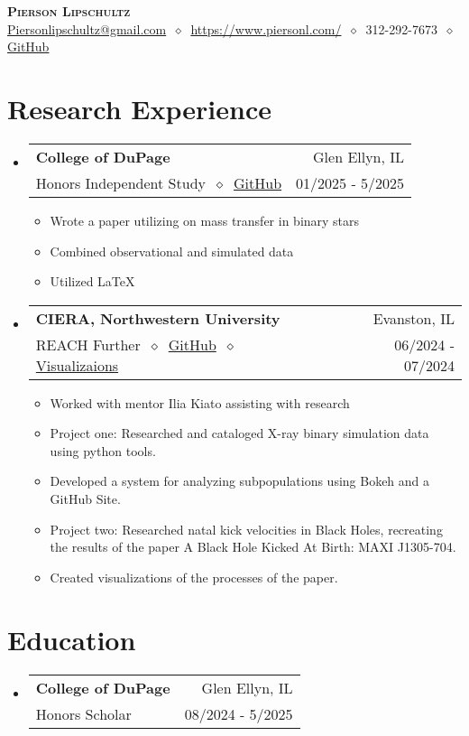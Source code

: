 \documentclass[letterpaper,11pt]{article}
\makeatletter
\newcommand{\cvitem}[1]{
  \item\small{
    {#1\vspace{-2pt}}
  }
}
\newcommand{\cvheading}[4]{
  \vspace{-2pt}\item
    \begin{tabular*}{\textwidth}[t]{l@{\extracolsep{\fill}}r}
      \textbf{#1} & #2 \\
      \small#3 & \small #4 \\
    \end{tabular*}\vspace{-7pt}
}
\newcommand{\cvheadingstart}{\begin{itemize}[leftmargin=0in, label={}]}
\newcommand{\cvheadingend}{\end{itemize}}
\newcommand{\cvitemstart}{\begin{itemize}[label=\textopenbullet]\justifying}
\newcommand{\cvitemend}{\end{itemize}\vspace{-5pt}}
\makeatother
\begin{document}
\begin{center}
  \textbf{\LARGE\scshape Pierson Lipschultz} \\
  \vspace{1pt}\small
  \href{mailto:}{Piersonlipschultz@gmail.com}
  $\ \diamond\ $
  \href{https://www.piersonl.com/}{https://www.piersonl.com/}
  $\ \diamond\ $ 
  312-292-7673
  $\ \diamond\ $
  \href{https://github.com/PiersonLip}{GitHub}
\end{center}

\section{Research Experience}
\cvheadingstart
  \cvheading
    {College of DuPage}{Glen Ellyn, IL}
    {Honors Independent Study $\ \diamond\ $ \href{https://github.com/PiersonLip/Honors-Independent-Study}{GitHub}}{01/2025 - 5/2025}
  \cvitemstart
    \cvitem{Wrote a paper utilizing on mass transfer in binary stars}
    \cvitem{Combined observational and simulated data}
    \cvitem{Utilized \LaTeX}
  \cvitemend

  \cvheading
    {CIERA, Northwestern University}{Evanston, IL}
    {REACH Further $\ \diamond\ $ \href{https://piersonlip.github.io/XB/}{GitHub} $\ \diamond\ $ \href{https://youtube.com/playlist?list=PLq73rWo79HTuEUPYdUz11PpY6DLhuF9Wl\&si=VjHikj-V-IePgofn}{Visualizaions}}{06/2024 - 07/2024}

  \cvitemstart
    \cvitem{Worked with mentor Ilia Kiato assisting with research}
    \cvitem{Project one: Researched and cataloged X-ray binary simulation data using python tools.}
    \cvitem{Developed a system for analyzing subpopulations using Bokeh and a GitHub Site.}
    \cvitem{Project two: Researched natal kick velocities in Black Holes, recreating the results of the paper A Black Hole Kicked At Birth: MAXI J1305-704.}
    \cvitem{Created visualizations of the processes of the paper.}
  \cvitemend


\cvheadingend

\section{Education}
\cvheadingstart
  \cvheading
    {College of DuPage}{Glen Ellyn, IL}
    {Honors Scholar}{08/2024 - 5/2025}
\cvheadingend
\end{document}
